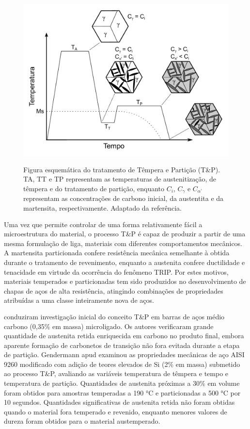 \begin{figure}
	\includegraphics[height=9cm]{img/esquemaTP.pdf}
	\caption{Figura esquemática do tratamento de Têmpera e Partição (T\&P). TA, TT e TP representam as temperaturas de austenitização, de têmpera e do tratamento de partição, enquanto $C_{i}$, $C_{\gamma}$ e $C_{\alpha\text{'}}$ representam as concentrações de carbono inicial, da austentita e da martensita, respectivamente. Adaptado da referência\cite{Edmonds2006}. }
	\label{fig:esqTP}
\end{figure}

Uma vez que permite controlar de uma forma relativamente fácil a microestrutura do material, o processo T\&P é capaz de produzir a partir de uma mesma formulação de liga, materiais com diferentes comportamentos mecânicos. A martensita particionada confere resistência mecânica semelhante à obtida durante o tratamento de revenimento, enquanto a austenita confere ductilidade e tenacidade em virtude da ocorrência do fenômeno TRIP\cite{Matlock2010}. Por estes motivos, materiais temperados e particionadas tem sido produzidos no desenvolvimento de chapas de aços de alta resistência, atingindo combinações de propriedades atribuídas a uma classe inteiramente nova de aços.

 conduziram investigação inicial do conceito T\&P em barras de aços médio carbono (0,35\% em massa) microligado. Os autores verificaram grande quantidade de austenita retida enriquecida em carbono no produto final, embora aparente formação de carbonetos de transição não fora evitada durante a etapa de partição. Gendermann apud\cite{Speer2004} examinou as propriedades mecânicas de aço AISI 9260 modificado com adição de teores elevados de Si (2\% em massa) submetido ao processo T\&P, avaliando as variáveis temperatura de têmpera e tempo e temperatura de partição. Quantidades de austenita próximas a 30\% em volume foram obtidos para amostras temperadas a 190 °C e particionadas a 500 °C por 10 segundos. Quantidades significativas de austenita retida não foram obtidas quando o material fora temperado e revenido, enquanto menores valores de dureza foram obtidos para o material austemperado.

